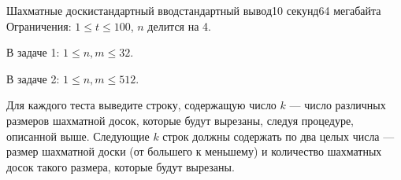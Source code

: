 \begin{problem}{Шахматные доски}{стандартный ввод}{стандартный вывод}{10 секунд}{64 мегабайта}
Ограничения: $1\le t\le 100$, $n$ делится на 4.

В задаче 1: $1\le n, m\le 32$.

В задаче 2: $1\le n, m\le 512$.


\OutputFile
Для каждого теста выведите строку, содержащую число $k$ --- число различных размеров шахматной досок, которые будут вырезаны, следуя процедуре, описанной выше. Следующие $k$ строк должны содержать по два целых числа --- размер шахматной доски (от большего к меньшему) и количество шахматных досок такого размера, которые будут вырезаны.

\Examples

\begin{example}
%
\end{example}

\end{problem}
